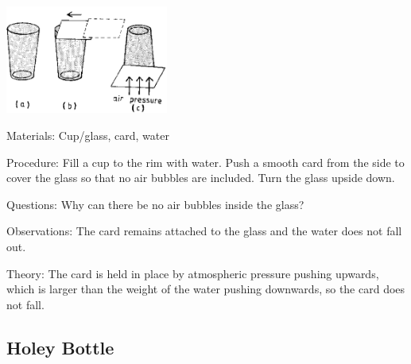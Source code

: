 \begin{multicols}{2}
\begin{center}
\includegraphics[width=0.4\textwidth]{./img/source/overturned-glass.png}
\end{center}

\begin{description*}
\item[Materials:]{Cup/glass, card, water}
\item[Procedure:]{Fill a cup to the rim with water. Push a smooth card from the side to cover the glass so that no air bubbles are included. Turn the glass upside down.}
\item[Questions:]{Why can there be no air bubbles inside the glass?}
\item[Observations:]{The card remains attached to the glass and the water does not fall out.}
\item[Theory:]{The card is held in place by atmospheric pressure pushing upwards, which is larger than the weight of the water pushing downwards, so the card does not fall.}
\end{description*}

\subsection{Holey Bottle}



\end{multicols}
